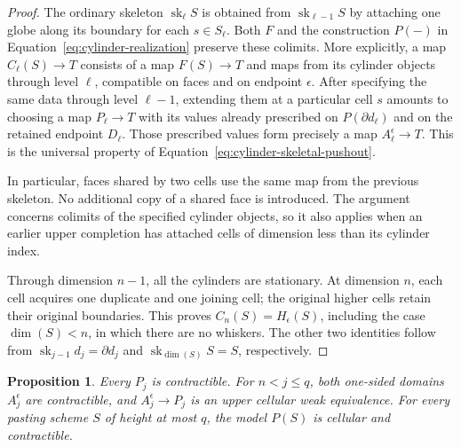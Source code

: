 \documentclass[11pt,letterpaper]{article}
\numberwithin{equation}{section}
\theoremstyle{plain}
\newtheorem{proposition}[theorem]{Proposition}
\theoremstyle{definition}
\theoremstyle{remark}
\DeclareMathOperator{\sk}{sk}
\begin{document}
\begin{proof}
The ordinary skeleton \(\sk_\ell S\) is obtained from
\(\sk_{\ell-1}S\) by attaching one globe along its boundary for
each \(s\in S_\ell\).  Both \(F\) and the construction
\(P(-)\) in Equation~\eqref{eq:cylinder-realization} preserve these
colimits.  More explicitly, a map \(C_\ell(S)\to T\) consists of
a map \(F(S)\to T\) and maps from its cylinder objects through
level \(\ell\), compatible on faces and on endpoint
\(\epsilon\).  After specifying the same data through level
\(\ell-1\), extending them at a particular cell \(s\) amounts
to choosing a map \(P_\ell\to T\) with its values already
prescribed on \(P(\partial d_\ell)\) and on the retained
endpoint \(D_\ell\).  Those prescribed values form precisely a
map \(A_\ell^\epsilon\to T\).  This is the universal property
of Equation~\eqref{eq:cylinder-skeletal-pushout}.

In particular, faces shared by two cells use the same map from the
previous skeleton.  No additional copy of a shared face is introduced.
The argument concerns colimits of the specified cylinder objects, so it
also applies when an earlier upper completion has attached cells of
dimension less than its cylinder index.

Through dimension \(n-1\), all the cylinders are stationary.  At
dimension \(n\), each cell acquires one duplicate and one joining
cell; the original higher cells retain their original boundaries.
This proves \(C_n(S)=H_\epsilon(S)\), including the case
\(\dim(S)<n\), in which there are no whiskers.  The other two
identities follow from \(\sk_{j-1}d_j=\partial d_j\) and
\(\sk_{\dim(S)}S=S\), respectively.
\end{proof}

\begin{proposition}\label{prop:cylinder-contractibility}
Every \(P_j\) is contractible.  For \(n<j\le q\), both
one-sided domains \(A_j^\epsilon\) are contractible, and
\(A_j^\epsilon\to P_j\) is an upper cellular weak equivalence.
For every pasting scheme \(S\) of height at most \(q\), the model
\(P(S)\) is cellular and contractible.
\end{proposition}
\end{document}
